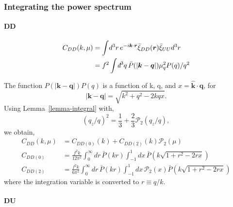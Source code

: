 \documentclass[a4paper,11pt, fleqn]{article}
\newcommand{\dbar}{\textit{\dj}}
\begin{document}
%
%
\clearpage
\subsubsection{Integrating the power spectrum}

\paragraph{DD}

\begin{align}
  C_{DD}(k, \mu) &=
    \int\! d^3 r \, e^{-i\bm{k}\cdot\bm{r}}
    \bar{\xi}_{DD}(\bm{r}) \bar{\xi}_{UU}d^3 r\\
  &= f^2 \int \! \dbar^3 q \, \bar{P}(|\bm{k} - \bm{q}|) \mu_q^2 P(q)/q^2
\end{align}

The function $P(|\bm{k} - \bm{q}|)P(q)$ is a function of k, q, and $x
= \bm{\hat{k}}\cdot\bm{q}$, for
\begin{equation}
  |\bm{k} - \bm{q}| = \sqrt{k^2 + q^2 - 2kqx}.
\end{equation}
Using Lemma~\ref{lemma-integral} with,
\begin{equation}
  (q_z/q)^2 = \frac{1}{3} + \frac{2}{3} \mathcal{P}_2(q_z/q),
\end{equation}
we obtain,
\begin{align}
  C_{DD}(k, \mu) &= C_{DD(0)}(k) +
                   C_{DD(2)}(k) \mathcal{P}_2(\mu)\\
  C_{DD(0)} &= \frac{f^2 k}{12\pi^2}
                \int_0^\infty \! dr \, \bar{P}(kr)
                \int_{-1}^1 \! dx \, 
                \bar{P}\left(k\sqrt{1 + r^2 - 2rx}\right)\\
  C_{DD(2)} &= \frac{f^2 k}{6\pi^2}
                \int_0^\infty \! dr \, \bar{P}(kr)
                \int_{-1}^1 \! dx \, \mathcal{P}_2(x)
                \bar{P}\left(k\sqrt{1 + r^2 - 2rx}\right)
\end{align}
where the integration variable is converted to $r \equiv q/k$.

\clearpage
\paragraph{DU}
\end{document}
